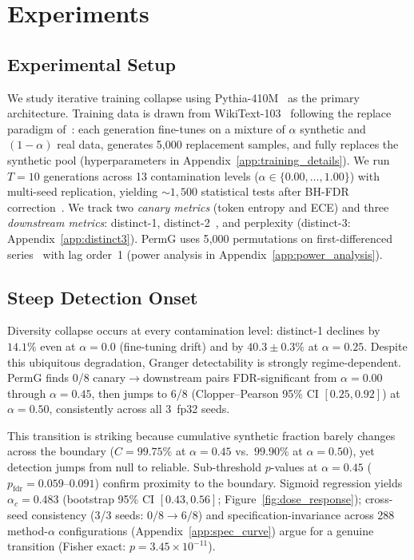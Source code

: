 \section{Experiments}
\label{sec:experiments}

\subsection{Experimental Setup}
\label{sec:setup}

We study iterative training collapse using Pythia-410M~\citep{biderman2023pythia} as the primary architecture.
Training data is drawn from WikiText-103~\citep{merity2017pointer} following the replace paradigm of~\citet{shumailov2024curse}: each generation fine-tunes on a mixture of $\alpha$ synthetic and $(1{-}\alpha)$ real data, generates 5{,}000 replacement samples, and fully replaces the synthetic pool (hyperparameters in Appendix~\ref{app:training_details}).
We run $T{=}10$ generations across 13 contamination levels ($\alpha \in \{0.00, \ldots, 1.00\}$) with multi-seed replication, yielding ${\sim}1{,}500$ statistical tests after BH-FDR correction~\citep{benjamini1995controlling}.
We track two \emph{canary metrics} (token entropy and ECE) and three \emph{downstream metrics}: distinct-1, distinct-2~\citep{li2016diversity}, and perplexity (distinct-3: Appendix~\ref{app:distinct3}).
PermG uses 5{,}000 permutations on first-differenced series~\citep{shojaie2022granger} with lag order~1 (power analysis in Appendix~\ref{app:power_analysis}).


\subsection{Steep Detection Onset}
\label{sec:regime}

Diversity collapse occurs at every contamination level: distinct-1 declines by $14.1\%$ even at $\alpha{=}0.0$ (fine-tuning drift) and by $40.3{\pm}0.3\%$ at $\alpha{=}0.25$.
Despite this ubiquitous degradation, Granger detectability is strongly regime-dependent.
PermG finds 0/8 canary$\to$downstream pairs FDR-significant from $\alpha{=}0.00$ through $\alpha{=}0.45$, then jumps to 6/8 (Clopper--Pearson 95\% CI $[0.25, 0.92]$) at $\alpha{=}0.50$, consistently across all 3~fp32 seeds.

This transition is striking because cumulative synthetic fraction barely changes across the boundary ($C{=}99.75\%$ at $\alpha{=}0.45$ vs.\ $99.90\%$ at $\alpha{=}0.50$), yet detection jumps from null to reliable.
Sub-threshold $p$-values at $\alpha{=}0.45$ ($p_{\mathrm{fdr}} = 0.059$--$0.091$) confirm proximity to the boundary.
Sigmoid regression yields $\alpha_c = 0.483$ (bootstrap 95\% CI $[0.43, 0.56]$; Figure~\ref{fig:dose_response}); cross-seed consistency (3/3 seeds: $0/8{\to}6/8$) and specification-invariance across 288 method-$\alpha$ configurations (Appendix~\ref{app:spec_curve}) argue for a genuine transition (Fisher exact: $p = 3.45 \times 10^{-11}$).


